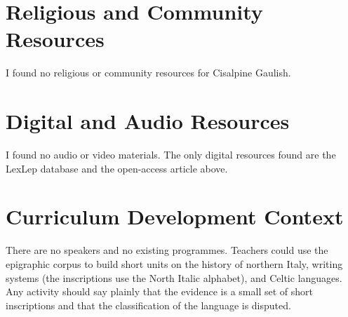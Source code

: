 \documentclass[12pt]{article}
\begin{document}
\section{Religious and Community Resources}
I found no religious or community resources for Cisalpine Gaulish.

\section{Digital and Audio Resources}
I found no audio or video materials. The only digital resources found are the LexLep database and the open-access article above.

\section{Curriculum Development Context}
There are no speakers and no existing programmes. Teachers could use the epigraphic corpus to build short units on the history of northern Italy, writing systems (the inscriptions use the North Italic alphabet), and Celtic languages. Any activity should say plainly that the evidence is a small set of short inscriptions and that the classification of the language is disputed.
\end{document}
